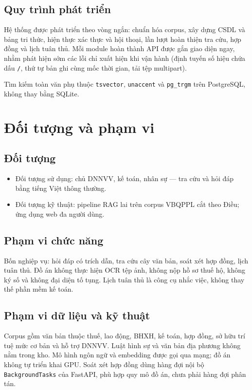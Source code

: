\subsection{Quy trình phát triển}

Hệ thống được phát triển theo vòng ngắn: chuẩn hóa corpus, xây dựng CSDL và bảng
tri thức, hiện thực xác thực và hội thoại, lần lượt hoàn thiện tra cứu, hợp đồng
và lịch tuân thủ. Mỗi module hoàn thành API được gắn giao diện ngay, nhằm phát
hiện sớm các lỗi chỉ xuất hiện khi vận hành (định tuyến số hiệu chứa dấu
\texttt{/}, thứ tự bản ghi cùng mốc thời gian, tải tệp multipart).

Tìm kiếm toàn văn phụ thuộc \texttt{tsvector}, \texttt{unaccent} và
\texttt{pg\_trgm} trên PostgreSQL, không thay bằng SQLite.

\section{Đối tượng và phạm vi}

\subsection{Đối tượng}

\begin{itemize}
    \item Đối tượng sử dụng: chủ DNNVV, kế toán, nhân sự --- tra cứu và hỏi đáp
    bằng tiếng Việt thông thường.
    \item Đối tượng kỹ thuật: pipeline RAG lai trên corpus VBQPPL cắt theo Điều;
    ứng dụng web đa người dùng.
\end{itemize}

\subsection{Phạm vi chức năng}

Bốn nghiệp vụ: hỏi đáp có trích dẫn, tra cứu cây văn bản, soát xét hợp đồng, lịch
tuân thủ. Đồ án không thực hiện OCR tệp ảnh, không nộp hồ sơ thuế hộ, không ký số
và không đại diện tố tụng. Lịch tuân thủ là công cụ nhắc việc, không thay thế phần
mềm kế toán.

\subsection{Phạm vi dữ liệu và kỹ thuật}

Corpus gồm \soLuat{} văn bản thuộc thuế, lao động, BHXH, kế toán, hợp đồng, sở hữu
trí tuệ mức cơ bản và hỗ trợ DNNVV. Luật hình sự và văn bản địa phương không nằm
trong kho. Mô hình ngôn ngữ và embedding được gọi qua mạng; đồ án không tự triển
khai GPU. Soát xét hợp đồng dùng hàng đợi nội bộ \texttt{BackgroundTasks} của
FastAPI, phù hợp quy mô đồ án, chưa phải hàng đợi phân tán.

